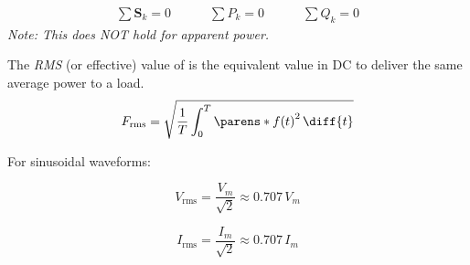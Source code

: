 \begin{multicols}{2}
\begin{CheatsheetEntryFrame}

    \end{CheatsheetEntryFrame}

    \begin{CheatsheetEntryFrame}

        \begin{gather*}
            \sum{\mathbf{S}_k} = 0
            \qquad\quad
            \sum{P_k} = 0
            \qquad\quad
            \sum{Q_k} = 0
        \end{gather*}
        {\footnotesize{}\emph{Note: This does NOT hold for apparent power.}}

    \end{CheatsheetEntryFrame}

    \MulticolsBreak

    \begin{CheatsheetEntryFrame}


        The \textit{RMS} (or effective) value of  is the equivalent value in DC to deliver the same average power to a load.
        \begin{equation*}
            F_\text{rms} =\sqrt{\frac{1}{T} \int_0^T{\parens*{f(t)}^2 \,\diff{t}}} 
        \end{equation*}

        For sinusoidal waveforms:

        \begin{minipage}{0.5\columnwidth}%
            \begin{equation*}
                V_\text{rms} = \frac{V_m}{\sqrt{2}} \approx 0.707 \, V_m
            \end{equation*}
        \end{minipage}%
        \begin{minipage}{0.5\columnwidth}%
            \begin{equation*}
                I_\text{rms} = \frac{I_m}{\sqrt{2}} \approx 0.707 \, I_m
            \end{equation*}
        \end{minipage}%


\end{CheatsheetEntryFrame}
\end{multicols}

